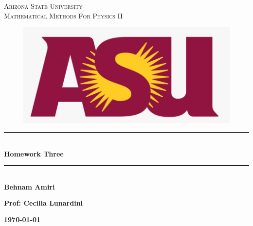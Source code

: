 \documentclass[fleqn]{article}
\begin{document}
  \begin{titlepage}

    \newcommand{\HRule}{\rule{\linewidth}{0.5mm}}

    \center

    \textsc{\LARGE Arizona State University}\\[1.5cm]

    \textsc{\LARGE Mathematical Methods For Physics II }\\[1.5cm]


    \begin{figure}
      \includegraphics[width=\linewidth]{asu.png}
    \end{figure}


    \HRule \\[0.4cm]
    { \huge \bfseries Homework Three}\\[0.4cm] 
    \HRule \\[1.5cm]

    \textbf{Behnam Amiri}

    \bigbreak

    \textbf{Prof: Cecilia Lunardini}

    \bigbreak


    \textbf{{\large \today}\\[2cm]}

    \vfill

  \end{titlepage}
\end{document}

